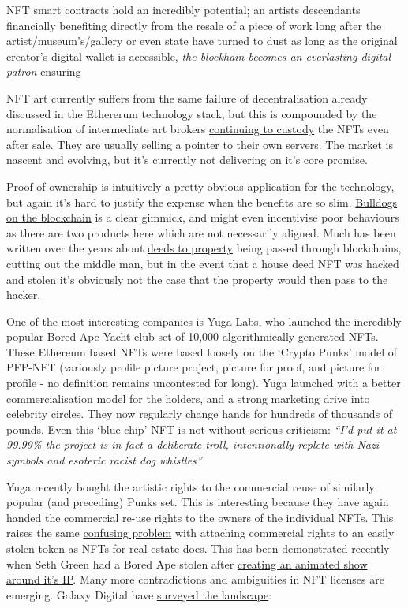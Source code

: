 NFT smart contracts hold an incredibly potential; an artists descendants
financially benefiting directly from the resale of a piece of work long
after the artist/museum's/gallery or even state have turned to dust as
long as the original creator's digital wallet is accessible, \emph{the
blockhain becomes an everlasting digital patron} ensuring


NFT art currently suffers from the same failure of decentralisation already discussed in the Ethererum technology stack, but this is compounded by the normalisation of intermediate art brokers \href{https://moxie.org/2022/01/07/web3-first-impressions.html}{continuing to custody} the NFTs even after sale. They are usually selling a pointer to their own servers. The market is nascent and evolving, but it's currently not delivering on it's core promise.\par
Proof of ownership is intuitively a pretty obvious application for the technology, but again it's hard to justify the expense when the benefits are so slim. \href{https://www.bullishlybred.com/}{Bulldogs on the blockchain} is a clear gimmick, and might even incentivise poor behaviours as there are two products here which are not necessarily aligned. Much has been written over the years about \href{https://propy.com/browse/propy-nft/}{deeds to property} being passed through blockchains, cutting out the middle man, but in the event that a house deed NFT was hacked and stolen it's obviously not the case that the property would then pass to the hacker.\par 
One of the most interesting companies is Yuga Labs, who launched the incredibly popular Bored Ape Yacht club set of 10,000 algorithmically generated NFTs. These Ethereum based NFTs were based loosely on the `Crypto Punks' model of PFP-NFT (variously profile picture project, picture for proof, and picture for profile - no definition remains uncontested for long). Yuga launched with a better commercialisation model for the holders, and a strong marketing drive into celebrity circles. They now regularly change hands for hundreds of thousands of pounds. Even this `blue chip' NFT is not without \href{https://twitter.com/coryklippsten/status/1538909505236283392}{serious criticism}: \textit{``I'd put it at 99.99\% the project is in fact a deliberate troll, intentionally replete with Nazi symbols and esoteric racist dog whistles''}\par
Yuga recently bought the artistic rights to the commercial reuse of similarly popular (and preceding) Punks set. This is interesting because they have again handed the commercial re-use rights to the owners of the individual NFTs. This raises the same \href{https://www.bloomberg.com/news/articles/2022-03-21/bored-ape-nft-spinoff-venture-gone-sour-sparks-legal-fight}{confusing problem} with attaching commercial rights to an easily stolen token as NFTs for real estate does. This has been demonstrated recently when Seth Green had a Bored Ape stolen after \href{https://www.buzzfeednews.com/article/sarahemerson/seth-green-bored-ape-stolen-tv-show}{creating an animated show around it's IP}. Many more contradictions and ambiguities in NFT licenses are emerging. Galaxy Digital have \href{https://www.galaxy.com/research/insights/a-survey-of-nft-licenses-facts-and-fictions/}{surveyed the landscape}:
